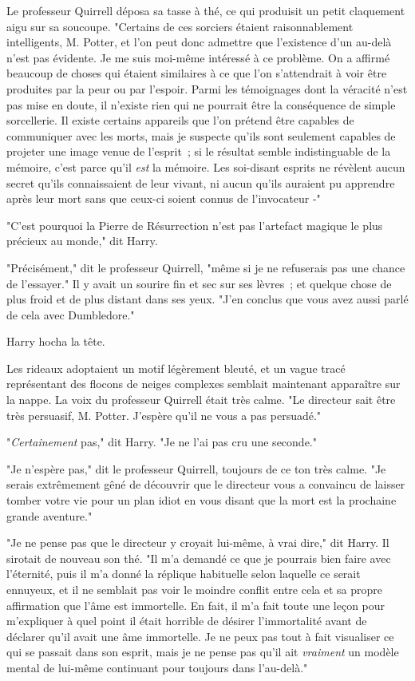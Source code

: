 Le professeur Quirrell déposa sa tasse à thé, ce qui produisit un petit claquement aigu sur sa soucoupe. "Certains de ces sorciers étaient raisonnablement intelligents, M. Potter, et l'on peut donc admettre que l'existence d'un au-delà n'est pas évidente. Je me suis moi-même intéressé à ce problème. On a affirmé beaucoup de choses qui étaient similaires à ce que l'on s'attendrait à voir être produites par la peur ou par l'espoir. Parmi les témoignages dont la véracité n'est pas mise en doute, il n'existe rien qui ne pourrait être la conséquence de simple sorcellerie. Il existe certains appareils que l'on prétend être capables de communiquer avec les morts, mais je suspecte qu'ils sont seulement capables de projeter une image venue de l'esprit~; si le résultat semble indistinguable de la mémoire, c'est parce qu'il \emph{est} la mémoire. Les soi-disant esprits ne révèlent aucun secret qu'ils connaissaient de leur vivant, ni aucun qu'ils auraient pu apprendre après leur mort sans que ceux-ci soient connus de l'invocateur -"

"C'est pourquoi la Pierre de Résurrection n'est pas l'artefact magique le plus précieux au monde," dit Harry.

"Précisément," dit le professeur Quirrell, "même si je ne refuserais pas une chance de l'essayer." Il y avait un sourire fin et sec sur ses lèvres~; et quelque chose de plus froid et de plus distant dans ses yeux. "J'en conclus que vous avez aussi parlé de cela avec Dumbledore."

Harry hocha la tête.

Les rideaux adoptaient un motif légèrement bleuté, et un vague tracé représentant des flocons de neiges complexes semblait maintenant apparaître sur la nappe. La voix du professeur Quirrell était très calme. "Le directeur sait être très persuasif, M. Potter. J'espère qu'il ne vous a pas persuadé."

"\emph{Certainement} pas," dit Harry. "Je ne l'ai pas cru une seconde."

"Je n'espère pas," dit le professeur Quirrell, toujours de ce ton très calme. "Je serais extrêmement gêné de découvrir que le directeur vous a convaincu de laisser tomber votre vie pour un plan idiot en vous disant que la mort est la prochaine grande aventure."

"Je ne pense pas que le directeur y croyait lui-même, à vrai dire," dit Harry. Il sirotait de nouveau son thé. "Il m'a demandé ce que je pourrais bien faire avec l'éternité, puis il m'a donné la réplique habituelle selon laquelle ce serait ennuyeux, et il ne semblait pas voir le moindre conflit entre cela et sa propre affirmation que l'âme est immortelle. En fait, il m'a fait toute une leçon pour m'expliquer à quel point il était horrible de désirer l'immortalité avant de déclarer qu'il avait une âme immortelle. Je ne peux pas tout à fait visualiser ce qui se passait dans son esprit, mais je ne pense pas qu'il ait \emph{vraiment} un modèle mental de lui-même continuant pour toujours dans l'au-delà."

